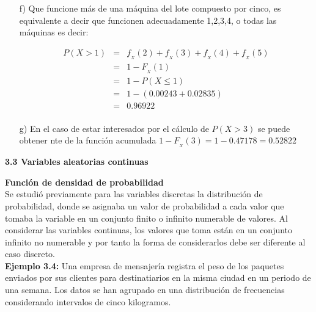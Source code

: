 \documentclass[base=hide,12pt]{elegantbook}
\begin{document}
\begin{itemize}
	
	
	\item[f)] Que funcione más de una máquina del lote compuesto por cinco, es equivalente a decir  que  funcionen adecuadamente 1,2,3,4, o todas las máquinas es decir:
	
	\begin{eqnarray*}
		P(X > 1) &=& f_{_{X}}(2) + f_{_{X}}(3) + f_{_{X}}(4) + f_{_{X}}(5)\\
		&=& 1 - F_{_{X}}(1) \\
		&=& 1-P(X\leq 1)  \\
		&=& 1 - (0.00243+0.02835) \\
		&=& 0.96922\\
	\end{eqnarray*}		
	
	
	\item[g)] En el caso de  estar interesados por el  cálculo de $P(X > 3)$ se puede obtener nte de la función acumulada $1-F_{_{X}}(3) =1-0.47178=0.52822$
\end{itemize}

\vspace{1cm}		

\textcolor{col4}{\large \bf 3.3 Variables aleatorias continuas}\\%
\vspace{.5cm}

\textcolor{col4}{\large \bf Función de densidad de probabilidad}\\%
\vspace{.5cm}	
Se estudió previamente para las variables discretas la  distribución de probabilidad, donde se asignaba un  valor de probabilidad a cada valor que tomaba la variable en un conjunto finito o infinito numerable de valores. Al considerar las variables continuas, los valores que toma están en un conjunto infinito no numerable y por tanto la forma de considerarlos debe ser diferente al caso discreto.\\



\textcolor{col3}{\bf Ejemplo 3.4:} Una empresa de mensajería registra el peso de los paquetes enviados por sus clientes para destinatiarios en la misma ciudad en un periodo de una semana. Los datos se han agrupado en una distribución de frecuencias considerando intervalos de cinco kilogramos.
\vspace{4cm}
\end{document}
